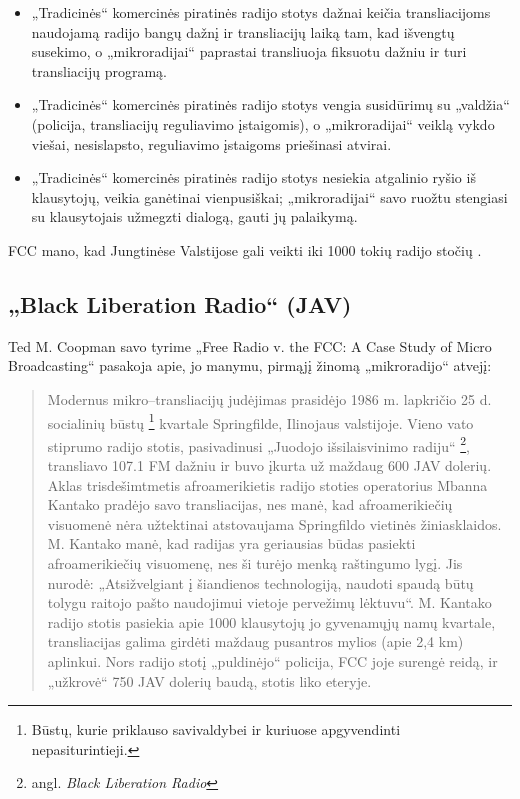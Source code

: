 \documentclass[kursinis-darbas]{vukf}
\begin{document}
\begin{itemize}
	\item „Tradicinės“ komercinės piratinės radijo stotys dažnai keičia transliacijoms naudojamą radijo bangų dažnį ir transliacijų laiką tam, kad išvengtų susekimo, o „mikroradijai“ paprastai transliuoja fiksuotu dažniu ir turi transliacijų programą.
	\item „Tradicinės“ komercinės piratinės radijo stotys vengia susidūrimų su „valdžia“ (policija, transliacijų reguliavimo įstaigomis), o „mikroradijai“ veiklą vykdo viešai, nesislapsto, reguliavimo įstaigoms priešinasi atvirai.
	\item „Tradicinės“ komercinės piratinės radijo stotys nesiekia atgalinio ryšio iš klausytojų, veikia ganėtinai vienpusiškai; „mikroradijai“ savo ruožtu stengiasi su klausytojais užmegzti dialogą, gauti jų palaikymą.
\end{itemize}

\gls{FCC} mano, kad Jungtinėse Valstijose gali veikti iki 1000 tokių radijo stočių \cite[p.~1]{tmc_fcc_enforcement_difficulties_with_unlicensed_micro_radio}.


\subsection{„Black Liberation Radio“ (JAV)}

Ted M. Coopman savo tyrime „Free Radio v. the \gls{FCC}: A Case Study of Micro Broadcasting“ \cite{tmc_free_radio_vs_the_fcc_a_case_study_of_micro_broadcasting} pasakoja apie, jo manymu, pirmąjį žinomą „mikroradijo“ atvejį:

\begin{quotation}
	Modernus mikro--transliacijų judėjimas prasidėjo 1986 m. lapkričio 25 d. socialinių būstų \footnote{Būstų, kurie priklauso savivaldybei ir kuriuose apgyvendinti nepasiturintieji.} kvartale Springfilde, Ilinojaus valstijoje. Vieno vato stiprumo radijo stotis, pasivadinusi „Juodojo išsilaisvinimo radiju“ \footnote{angl. \emph{Black Liberation Radio}}, transliavo 107.1 FM dažniu ir buvo įkurta už maždaug 600 JAV dolerių.
	Aklas trisdešimtmetis afroamerikietis radijo stoties operatorius Mbanna Kantako pradėjo savo transliacijas, nes manė, kad afroamerikiečių visuomenė nėra užtektinai atstovaujama Springfildo vietinės žiniasklaidos. M. Kantako manė, kad radijas yra geriausias būdas pasiekti afroamerikiečių visuomenę, nes ši turėjo menką raštingumo lygį.
	Jis nurodė: „Atsižvelgiant į šiandienos technologiją, naudoti spaudą būtų tolygu raitojo pašto naudojimui vietoje pervežimų lėktuvu“.
	M. Kantako radijo stotis pasiekia apie 1000 klausytojų jo gyvenamųjų namų kvartale, transliacijas galima girdėti maždaug pusantros mylios (apie 2,4 km) aplinkui. Nors radijo stotį „puldinėjo“ policija, \gls{FCC} joje surengė reidą, ir „užkrovė“ 750 JAV dolerių baudą, stotis liko eteryje.
\end{quotation}
\end{document}

